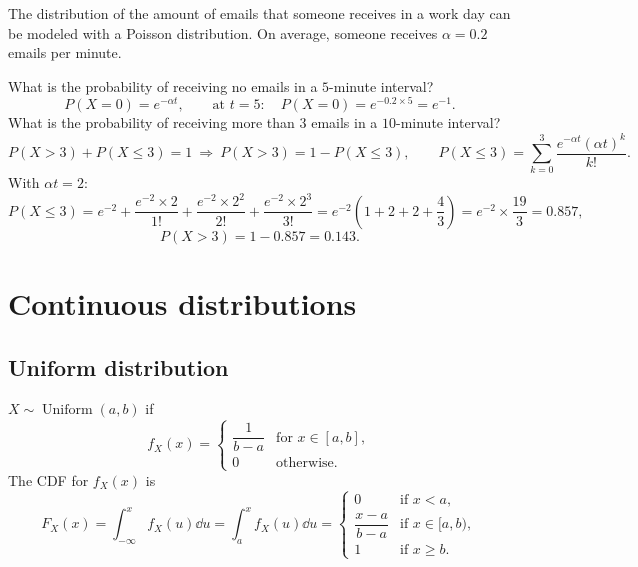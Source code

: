 \begin{example}
The distribution of the amount of emails that someone receives in a work day can be modeled with a Poisson distribution. On average, someone receives $\alpha = 0.2$ emails per minute.

What is the probability of receiving no emails in a $5$-minute interval?
\[
P(X = 0) = e^{-\alpha t}, \qquad \text{at } t = 5: \quad P(X=0) = e^{-0.2\times 5} = e^{-1}.
\]
What is the probability of receiving more than $3$ emails in a $10$-minute interval?
\[
P(X > 3) + P(X \le 3) = 1 \ \Rightarrow\ P(X > 3) = 1 - P(X \le 3),
\qquad
P(X \le 3) = \sum_{k=0}^{3}\frac{e^{-\alpha t}(\alpha t)^k}{k!}.
\]
With $\alpha t = 2$:
\[
P(X \le 3) = e^{-2} + \frac{e^{-2}\times 2}{1!} + \frac{e^{-2}\times 2^2}{2!} + \frac{e^{-2}\times 2^3}{3!}
= e^{-2}\left(1 + 2 + 2 + \frac43\right) = e^{-2}\times\frac{19}{3} = 0.857,
\]
\[
P(X > 3) = 1 - 0.857 = 0.143.
\]
\end{example}

\section{Continuous distributions}

\subsection{Uniform distribution}
$X \sim \operatorname{Uniform}(a,b)$ if
\[
f_X(x) =
\begin{cases}
\dfrac{1}{b-a} & \text{for } x \in [a,b],\\[4pt]
0 & \text{otherwise}.
\end{cases}
\]
The CDF for $f_X(x)$ is
\[
F_X(x) = \int_{-\infty}^{x} f_X(u)\dd u = \int_{a}^{x} f_X(u)\dd u
=
\begin{cases}
0 & \text{if } x < a,\\[2pt]
\dfrac{x-a}{b-a} & \text{if } x \in [a,b),\\[4pt]
1 & \text{if } x \ge b.
\end{cases}
\]
\begin{center}
\end{center}

